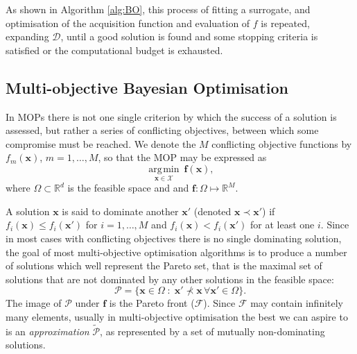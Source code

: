 \documentclass[conference]{IEEEtran}
\newcommand{\evaluatedx}{\bX}
\newcommand{\paretofront}{\mathcal{F}}
\newcommand{\paretoset}{\mathcal{P}}
\newcommand{\attainmentfront}{\mathcal{A}}
\newcommand{\attainmentset}{\evaluatedx_{\mathcal{A}}}
\newcommand{\parameterspace}{\Omega}
\newcommand{\ndim}{d}
\newcommand{\nobj}{M}
\DeclareMathOperator*{\argmin}{\arg\!\min}
\newcommand\Papprox{\tilde{\mathcal{P}}}
\newcommand\mX{\mathcal{X}}
\newcommand{\bx}{\mathbf{x}}
\newcommand{\bX}{\mathbf{X}}
\newcommand{\bff}{\mathbf{f}}
\newcommand{\mnote}[2][\textcolor{red}{\dagger}]{$#1$\marginpar{\color{red}\raggedright\tiny$#1$
    #2}}
\begin{document}
As shown in Algorithm
\ref{alg:BO},  this process of fitting a surrogate, and optimisation of the acquisition function and evaluation of $f$ is repeated,  expanding $\mathcal{D}$,  until a good solution is found and some stopping criteria is satisfied or the computational budget is exhausted.

\subsection{Multi-objective Bayesian Optimisation}\label{section:background_MOPs}
In MOPs there is not one single criterion by which the success of a solution is assessed, but rather a series of conflicting objectives, between which some compromise must be reached. We denote the $\nobj$ conflicting objective functions by $f_m(\bx)$, $m = 1, \ldots, \nobj$, so that the MOP may be expressed 
as 
\begin{equation}\label{eqn: min_F}
\underset{\mathbf{x} \in \mX}{\argmin}\:\mathbf{f}(\mathbf{x}), 
\end{equation}
where $\parameterspace \subset \mathbb{R}^\ndim$ is the feasible space and and $\mathbf{f}: \Omega \mapsto \mathbb{R}^{\nobj}$.

A solution $\bx$ is said to dominate another $\bx'$ (denoted $\bx \prec \bx'$) if $f_i(\bx) \le f_i(\bx')$ for $i = 1, \ldots, \nobj$ and $ f_i(\bx) < f_i(\bx')$ for at least one $i$. Since in most cases with conflicting objectives there is no single dominating solution, the goal of most multi-objective optimisation algorithms is to produce a number of solutions which well represent the Pareto set, that is the maximal set of solutions that are not dominated by any other solutions in the feasible space:
\begin{equation}\label{eqn: Pareto_set}
  \paretoset = \{\mathbf{x} \in \parameterspace \;:\;
  \bx' \not\prec \bx \,\forall \bx' \in \parameterspace \}.
\end{equation}
The image of $\paretoset$ under $\bff$ is the Pareto front ($\paretofront$). Since $\paretofront$ may contain infinitely many elements, usually  in multi-objective optimisation the best we can aspire to is an \emph{approximation} $\Papprox$, as represented by a set of mutually non-dominating solutions.

\end{document}
